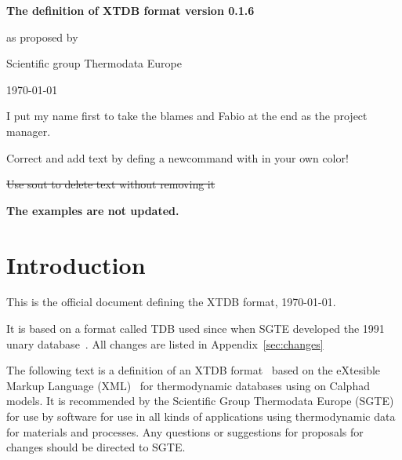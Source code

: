 \documentclass{article}
\begin{document}
\newcommand{\xtdbva}{0}
\newcommand{\xtdbvb}{1}
\newcommand{\xtdbvc}{6 }

\begin{center}

  {\Large \bf The definition of XTDB format version \xtdbva.\xtdbvb.\xtdbvc}

  as proposed by

  Scientific group Thermodata Europe



  \today

\end{center}

I put my name first to take the blames and Fabio at the end as the
project manager.

\newcommand{\bosse}[1]{{\color{magenta} #1}}

\bosse{Correct and add text by defing a newcommand with in your own color!}

\newcommand{\avdw}[1]{{\color{green} #1}}

\sout{Use sout to delete text without removing it}

{\bf The examples are  not updated.}

\section{Introduction}

This is the official document defining the XTDB format, \today.

It is based on a format called TDB used since when SGTE developed the
1991 unary database~\cite{91Din}.  All changes are listed in
Appendix~\ref{sec:changes}

The following text is a definition of an XTDB format~\cite{XTDB} based
on the eXtesible Markup Language (XML)~\cite{XML} for thermodynamic
databases using on Calphad models.  It is recommended by the
Scientific Group Thermodata Europe (SGTE)~\cite{SGTE} for use by
software for use in all kinds of applications using thermodynamic data
for materials and processes.  Any questions or suggestions for
proposals for changes should be directed to SGTE.
\end{document}
